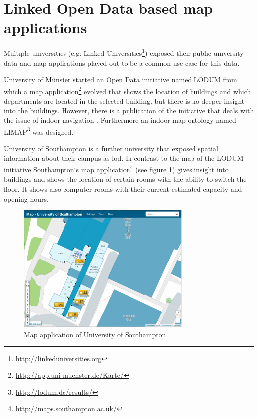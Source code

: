 \documentclass[draft,final]{vutinfth} %
\begin{document}
\section{Linked Open Data based map applications}
\label{related-work-map-app}

Multiple universities (e.g. Linked Universities\footnote{\url{http://linkeduniversities.org}}) exposed their public university data and map applications played out to be a common use case for this data.

University of Münster started an Open Data initiative named LODUM\cite{kesler_linked_2012} from which a map application\footnote{\url{http://app.uni-muenster.de/Karte/}} evolved that shows the location of buildings and which departments are located in the selected building, but there is no deeper insight into the buildings. However, there is a publication of the initiative that deals with the issue of indoor navigation \cite{kostic_automated_2015-1}. Furthermore an indoor map ontology named LIMAP\footnote{\url{http://lodum.de/results/}} was designed.

University of Southampton is a further university that exposed spatial information about their campus as \gls{lod}. In contrast to the map of the LODUM initiative Southampton`s map application\footnote{\url{http://maps.southampton.ac.uk/}} (see figure \ref{fig:related-work-map-app:southampton}) gives insight into buildings and shows the location of certain rooms with the ability to switch the floor. It shows also computer rooms with their current estimated capacity and opening hours.  

\begin{figure}[h]
    \centering
    \includegraphics[width=0.75\textwidth]{graphics/maps/southampton-map-app.png}
    \caption{Map application of University of Southampton}
    \label{fig:related-work-map-app:southampton}
\end{figure}
\end{document}

